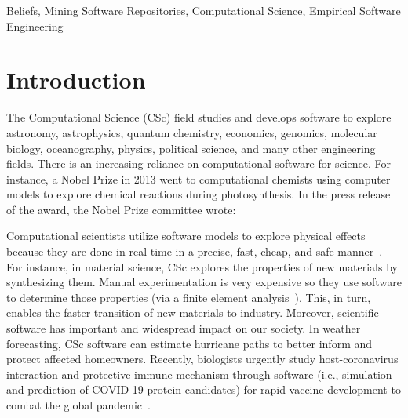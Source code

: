 \documentclass[conference,10pt]{IEEEtran}
\begin{document}
\begin{IEEEkeywords}
Beliefs, Mining Software Repositories, Computational Science, Empirical Software Engineering
\end{IEEEkeywords}



%
%
\vspace{-5pt}
\section{Introduction}


The Computational Science (CSc)
field studies and develops software to explore
 astronomy, astrophysics, quantum chemistry, economics, genomics, molecular biology, oceanography, physics, political science,  and many other  engineering fields. 
There is an increasing reliance on computational software for science. For instance, a Nobel Prize in 2013 went to computational chemists using computer models to explore chemical reactions during photosynthesis. In the press release of the award, the Nobel Prize committee wrote: \vspace{-3pt}

\begin{quote}
\end{quote}


Computational scientists utilize software models to explore physical effects because they are done in real-time in a precise, fast, cheap, and safe manner~\cite{heaton15_lit}. For instance, in material science, CSc explores the properties
of new materials by synthesizing them. Manual experimentation is very expensive so they %
use software to determine
those properties (via a finite element analysis~\cite{fea_01}). This, in turn, enables the faster transition of new materials to industry. Moreover, scientific software has important and widespread impact on our society. In weather forecasting, CSc
software can estimate hurricane paths to better inform and protect affected homeowners. Recently, biologists urgently study host-coronavirus interaction and protective immune mechanism through software (i.e., simulation and prediction of COVID-19 protein candidates) for rapid vaccine development to combat the global pandemic~\cite{covid}. 
\end{document}
